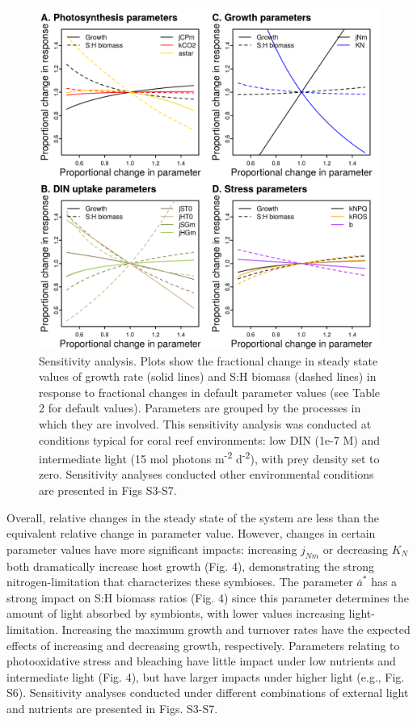 \documentclass[]{elsarticle} %
\makeatletter
\def\maxwidth{\ifdim\Gin@nat@width>\linewidth\linewidth
\else\Gin@nat@width\fi}
\let\Oldincludegraphics\includegraphics
\renewcommand{\includegraphics}[1]{\Oldincludegraphics[width=\maxwidth]{#1}}
\makeatother
\begin{document}
\begin{figure}[htbp]
\centering
\includegraphics{../img/Fig4.png}
\caption{Sensitivity analysis. Plots show the fractional change in
steady state values of growth rate (solid lines) and S:H biomass (dashed
lines) in response to fractional changes in default parameter values
(see Table 2 for default values). Parameters are grouped by the
processes in which they are involved. This sensitivity analysis was
conducted at conditions typical for coral reef environments: low DIN
(1e-7 M) and intermediate light (15 mol photons m\textsuperscript{-2}
d\textsuperscript{-2}), with prey density set to zero. Sensitivity
analyses conducted other environmental conditions are presented in Figs
S3-S7.}
\end{figure}

Overall, relative changes in the steady state of the system are less
than the equivalent relative change in parameter value. However, changes
in certain parameter values have more significant impacts: increasing
\(j_{Nm}\) or decreasing \(K_N\) both dramatically increase host growth
(Fig. 4), demonstrating the strong nitrogen-limitation that
characterizes these symbioses. The parameter \(\bar{a}^*\) has a strong
impact on S:H biomass ratios (Fig. 4) since this parameter determines
the amount of light absorbed by symbionts, with lower values increasing
light-limitation. Increasing the maximum growth and turnover rates have
the expected effects of increasing and decreasing growth, respectively.
Parameters relating to photooxidative stress and bleaching have little
impact under low nutrients and intermediate light (Fig. 4), but have
larger impacts under higher light (e.g., Fig. S6). Sensitivity analyses
conducted under different combinations of external light and nutrients
are presented in Figs. S3-S7.
\end{document}
